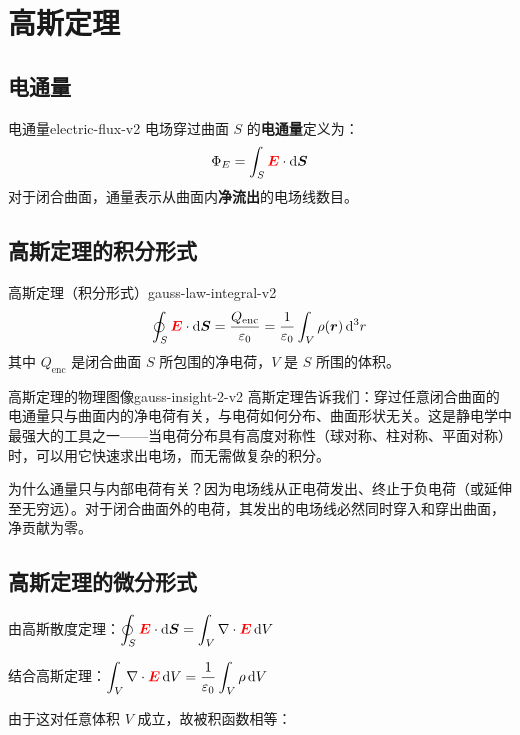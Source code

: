 \documentclass[11pt,a4paper,openany,oneside]{book}
\newcommand{\diff}{\mathrm{d}}
\newcommand{\vecE}{\textcolor{red}{\vect{E}}}
\newcommand{\eps}{\varepsilon}
\newcommand{\vect}[1]{\bm{#1}}
\newcommand{\divg}{\nabla\cdot}
\begin{document}
\section{高斯定理}

\subsection{电通量}

\begin{definition}{电通量}{electric-flux-v2}
电场穿过曲面 $S$ 的\textbf{电通量}定义为：
\[
\Phi_E = \int_S \vecE \cdot \diff\vect{S}
\]
对于闭合曲面，通量表示从曲面内\textbf{净流出}的电场线数目。
\end{definition}

\subsection{高斯定理的积分形式}

\begin{theorem}{高斯定理（积分形式）}{gauss-law-integral-v2}
\[
\oint_S \vecE \cdot \diff\vect{S} = \frac{Q_{\text{enc}}}{\eps_0} = \frac{1}{\eps_0} \int_V \rho(\vect{r}) \, \diff^3r
\]
其中 $Q_{\text{enc}}$ 是闭合曲面 $S$ 所包围的净电荷，$V$ 是 $S$ 所围的体积。
\end{theorem}

\begin{insight}{高斯定理的物理图像}{gauss-insight-2-v2}
高斯定理告诉我们：穿过任意闭合曲面的电通量只与曲面内的净电荷有关，与电荷如何分布、曲面形状无关。这是静电学中最强大的工具之一——当电荷分布具有高度对称性（球对称、柱对称、平面对称）时，可以用它快速求出电场，而无需做复杂的积分。

为什么通量只与内部电荷有关？因为电场线从正电荷发出、终止于负电荷（或延伸至无穷远）。对于闭合曲面外的电荷，其发出的电场线必然同时穿入和穿出曲面，净贡献为零。
\end{insight}

\subsection{高斯定理的微分形式}

由高斯散度定理：$\displaystyle\oint_S \vecE \cdot \diff\vect{S} = \int_V \divg\vecE \, \diff V$

结合高斯定理：$\displaystyle\int_V \divg\vecE \, \diff V = \frac{1}{\eps_0} \int_V \rho \, \diff V$

由于这对任意体积 $V$ 成立，故被积函数相等：
\end{document}
